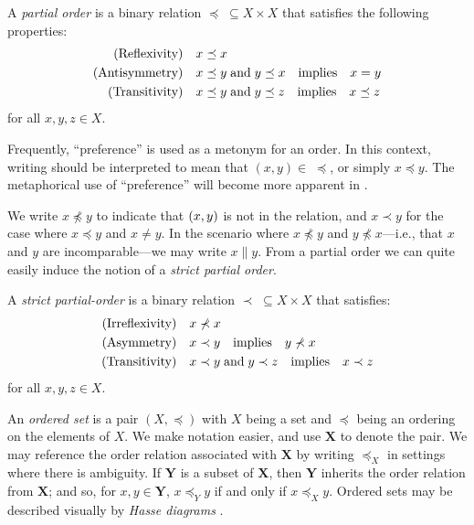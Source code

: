 \begin{definition}
	\label{definition:partial-order}

	A \textit{partial order}  is a binary relation $\preceq \; \subseteq X \times X$ that satisfies the
	following properties:
	\begin{align}
		\text{(Reflexivity)}\quad  & x \preceq x                                      \\
		\text{(Antisymmetry)}\quad & x \preceq y \; \text{and} \; y \preceq x \quad \text{implies} \quad x = y       \\
		\text{(Transitivity)}\quad & x \preceq y \; \text{and} \; y \preceq z \quad \text{implies} \quad x \preceq z
	\end{align}
	for all $x,y,z \in X$.
\end{definition}

Frequently, ``preference'' is used as a metonym for an order. In this context, writing 
should be interpreted to mean that $(x, y) \in \; \preceq$, or simply $x \preceq y$. The metaphorical use of ``preference''
will become more apparent in .

We write $x \npreceq y$ to indicate that $(x,y)$ is not in the relation, and $x \prec y$ for the case where $x\preceq
y$ and $x \not = y$. In the scenario where $x \not \preceq y$ and $y \not \preceq x$---i.e., that $x$ and $y$ are
incomparable---we may write $x \parallel y$. From a partial order we can quite easily induce the notion of a \emph{strict
partial order}.

\begin{definition}
	\label{definition:strict-partial-order} A \textit{strict partial-order}  is
	a binary relation $\prec \; \subseteq X \times X$ that satisfies:
	\begin{align}
		\text{(Irreflexivity)}\quad & x \nprec x                                 \\
		\text{(Asymmetry)}\quad     & x \prec y \quad \text{implies} \quad y \nprec x                \\
		\text{(Transitivity)}\quad  & x \prec y \; \text{and} \; y \prec z \quad \text{implies} \quad x \prec z
	\end{align}
	for all $x,y,z \in X$.
\end{definition}

An \textit{ordered set} is a pair $(X, \preceq)$ with $X$ being a set and $\preceq$ being an ordering on the elements of
$X$. We make notation easier, and use $\mathbf{X}$ to denote the pair. We may reference the order relation associated with
$\mathbf{X}$ by writing $\preceq_{X}$ in settings where there is ambiguity. If $\mathbf{Y}$ is a subset of $\mathbf{X}$,
then $\mathbf{Y}$ inherits the order relation from $\mathbf{X}$; and so, for $x,y \in \mathbf{Y}$, $x \preceq_{Y}y$ if
and only if $x \preceq_{X}y$.  Ordered sets may be described visually by \textit{Hasse diagrams}
\cite{Huth_Ryan_2004}. 

